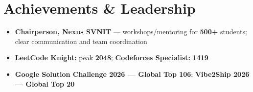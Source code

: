 \documentclass[a4paper,10pt]{article}
\begin{document}
\section{Achievements \& Leadership}
\begin{itemize}
  \item \textbf{Chairperson, Nexus SVNIT} --- workshops/mentoring for \textbf{500+} students; clear communication and team coordination
  \item \textbf{LeetCode Knight:} peak \textbf{2048}; \textbf{Codeforces Specialist:} \textbf{1419}
  \item \textbf{Google Solution Challenge 2026 --- Global Top 106}; \textbf{Vibe2Ship 2026 --- Global Top 20}
\end{itemize}
\end{document}
